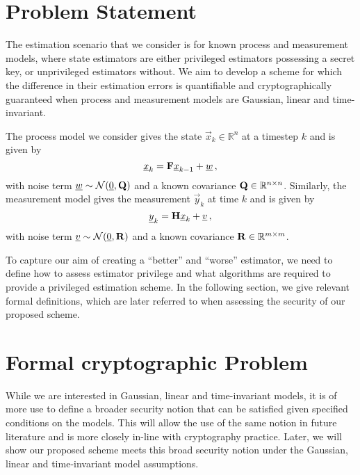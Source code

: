 \documentclass[conference]{IEEEtran}
\theoremstyle{definition}
\theoremstyle{definition}
\theoremstyle{remark}
\begin{document}
\section{Problem Statement}\label{sec:problem}
The estimation scenario that we consider is for known process and measurement models, where state estimators are either privileged estimators possessing a secret key, or unprivileged estimators without. We aim to develop a scheme for which the difference in their estimation errors is quantifiable and cryptographically guaranteed when process and measurement models are Gaussian, linear and time-invariant.

The process model we consider gives the state $\vec{x}_k\in\mathbb{R}^n$ at a timestep $k$ and is given by
\begin{equation}\label{eqn:linear_process_model}
   \vec{x}_k = \mat{F}\vec{x}_{k-1} + \vec{w}\,,
\end{equation}
with noise term ${\underline{w}}\sim \mathcal{N}({\underline{0}}, {{\mathbf{Q}}})$ and a known covariance ${{\mathbf{Q}}}\in \mathbb{R}^{n\times n}$. Similarly, the measurement model gives the measurement $\vec{y}_k$ at time $k$ and is given by
\begin{equation}\label{eqn:linear_measurement_model}
   \vec{y}_k = \mat{H}\vec{x}_k + \vec{v}\,,
\end{equation}
with noise term ${\underline{v}}\sim \mathcal{N}({\underline{0}}, {{\mathbf{R}}})$ and a known covariance ${{\mathbf{R}}}\in \mathbb{R}^{m\times m}$.

To capture our aim of creating a ``better'' and ``worse'' estimator, we need to define how to assess estimator privilege and what algorithms are required to provide a privileged estimation scheme. In the following section, we give relevant formal definitions, which are later referred to when assessing the security of our proposed scheme.

% 
%                                                        
%                                                        
%                                                        
% 

\section{Formal cryptographic Problem}\label{sec:crypto_problem}
While we are interested in Gaussian, linear and time-invariant models, it is of more use to define a broader security notion that can be satisfied given specified conditions on the models. This will allow the use of the same notion in future literature and is more closely in-line with cryptography practice. Later, we will show our proposed scheme meets this broad security notion under the Gaussian, linear and time-invariant model assumptions.
\end{document}
